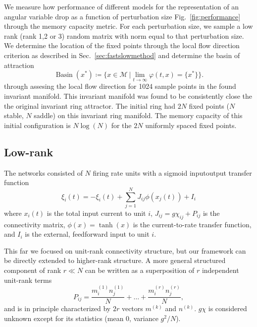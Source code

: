\documentclass{article} %
\newcounter{ct}
\newcommand{\manifold}{\mathcal{M}}
\DeclareMathOperator{\basin}{Basin}
\theoremstyle{definition}
\theoremstyle{remark}
\begin{document}

We measure how performance of different models for the representation of an angular variable drop as a function of perturbation size Fig.~\ref{fig:performance} through the memory capacity metric.
For each perturbation size, we sample a low rank (rank 1,2 or 3) random matrix with norm equal to that perturbation size.
We determine the location of the fixed points through the local flow direction criterion as described in Sec.~\ref{sec:fastslowmethod}
and determine the basin of attraction
\begin{equation}
\basin(x^*) \coloneqq \{x\in \manifold \ | \lim_{t\rightarrow\infty}\varphi(t,x)=\{x^*\}\}.
\end{equation}
through assesing the local flow direction for 1024 sample points in the found invariant manifold.
This invariant manifold was found to be consistently close the the original invariant ring attractor.
The initial ring had $2N$ fixed points ($N$ stable, $N$ saddle) on this invariant ring manifold.
The memory capacity of this initial configuration is $N\log(N)$ for the $2N$ uniformly spaced fixed points.


%


\subsection{Low-rank}\label{sec:supp:lowrank}


The networks consisted of $N$ firing rate units with a sigmoid inputoutput transfer function \citep{mastrogiuseppe2018}
\begin{equation}
\xi_i(t) = - \xi_i(t) + \sum_{j=1}^{N} J_{ij}\phi(x_j(t)) + I_i
\label{eq:1}
\end{equation}
where $x_i(t)$ is the total input current to unit $i$,
$ J_{ij} = g\chi_{ij} + P_{ij}$ is the connectivity matrix, 
$\phi(x) = \operatorname{tanh}(x)$ is the current-to-rate transfer function, and $I_i$ is the external, feedforward input to unit $i$.

This far we focused on unit-rank connectivity structure, but our framework can be directly extended to higher-rank structure. A more general structured component of rank $r\ll N$ can be written as a superposition of $r$ independent unit-rank terms 
\begin{equation}
P_{ij} = \frac{m^{(1)}_i n^{(1)}_j}{N} + \dots + \frac{m^{(r)}_i n^{(r)}_j}{N},
\end{equation} and is in principle characterized by $2r$ vectors $m^{(k)}$ and $n^{(k)}$.
$g\chi$ is considered unknown except for its statistics (mean 0, variance $g^2/N$).
\end{document}
